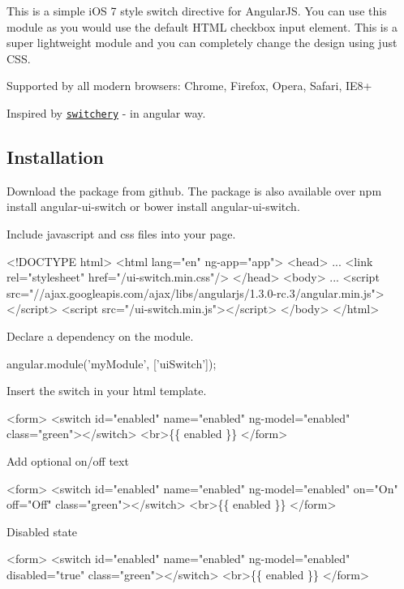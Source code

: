 This is a simple i\+OS 7 style switch directive for Angular\+JS. You can use this module as you would use the default H\+T\+ML checkbox input element. This is a super lightweight module and you can completely change the design using just C\+SS.

Supported by all modern browsers\+: Chrome, Firefox, Opera, Safari, I\+E8+



Inspired by \href{https://github.com/abpetkov/switchery}{\tt switchery} -\/ in angular way.

\subsection*{Installation}

Download the package from {\ttfamily github}. The package is also available over {\ttfamily npm install angular-\/ui-\/switch} or {\ttfamily bower install angular-\/ui-\/switch}.

Include {\ttfamily javascript} and {\ttfamily css} files into your page.


\begin{DoxyCode}
<!DOCTYPE html>
<html lang="en" ng-app="app">
<head>
  ...
  <link rel="stylesheet" href="/ui-switch.min.css"/>
</head>
<body>
  ...
  <script src="//ajax.googleapis.com/ajax/libs/angularjs/1.3.0-rc.3/angular.min.js"></script>
  <script src="/ui-switch.min.js"></script>
</body>
</html>
\end{DoxyCode}


Declare a dependency on the module.


\begin{DoxyCode}
angular.module('myModule', ['uiSwitch']);
\end{DoxyCode}


Insert the switch in your html template.


\begin{DoxyCode}
<form>
  <switch id="enabled" name="enabled" ng-model="enabled" class="green"></switch>
  <br>\{\{ enabled \}\}
</form>
\end{DoxyCode}


Add optional on/off text 
\begin{DoxyCode}
<form>
  <switch id="enabled" name="enabled" ng-model="enabled" on="On" off="Off" class="green"></switch>
  <br>\{\{ enabled \}\}
</form>
\end{DoxyCode}


Disabled state 
\begin{DoxyCode}
<form>
  <switch id="enabled" name="enabled" ng-model="enabled" disabled="true" class="green"></switch>
  <br>\{\{ enabled \}\}
</form>
\end{DoxyCode}


